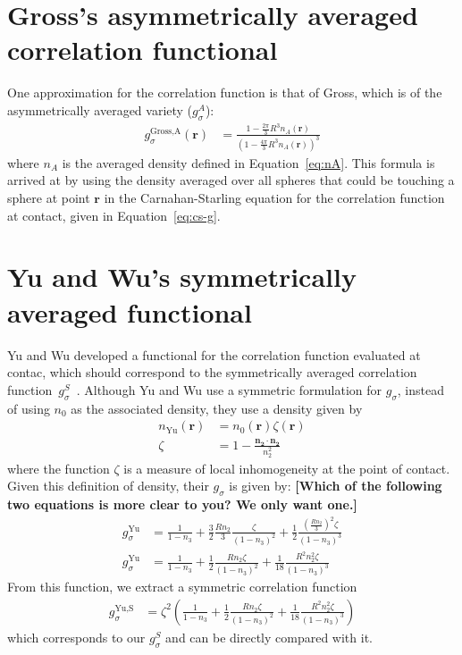 \documentclass[letterpaper,twocolumn,amsmath,amssymb,jcp,10pt,aip]{revtex4-1}
\newcommand{\red}[1]{{\bf \color{red} #1}}
\newcommand{\rr}{\textbf{r}}
\newcommand{\fixme}[1]{\red{[#1]}}
\begin{document}
\section{Gross's asymmetrically averaged correlation functional}\label{sec:gross}
One approximation for the correlation function is that of
Gross\cite{gross2009density}, which is of the asymmetrically averaged
variety ($g_\sigma^A$):
\begin{align}
  g_\sigma^\text{Gross,A}(\rr) &= \frac{1 - \frac{2\pi}{3}R^3n_A(\rr)}{\left(1 -
    \frac{4\pi}{3}R^3n_A(\rr)\right)^3}
\end{align}
where $n_A$ is the averaged density defined in Equation~\ref{eq:nA}.
This formula is arrived at by using the density averaged over all
spheres that could be touching a sphere at point $\rr$ in the
Carnahan-Starling equation for the correlation function at contact,
given in Equation~\ref{eq:cs-g}.

\section{Yu and Wu's symmetrically averaged functional}\label{sec:yuwu}

Yu and Wu developed a functional for the correlation function
evaluated at contac, which should correspond to the symmetrically
averaged correlation
function~$g_\sigma^S$~\cite{yu2002fmt-dft-inhomogeneous-associating}.
Although Yu and Wu use a symmetric formulation for $g_\sigma$, instead
of using $n_0$ as the associated density, they use a density given by
\begin{align}
  n_\text{Yu}(\rr) &= n_0(\rr) \zeta(\rr) \\
  \zeta &= 1 - \frac{\mathbf{n_2}\cdot\mathbf{n_2}}{n_2^2}
\end{align}
where the function $\zeta$ is a measure of local inhomogeneity at the
point of contact.  Given this definition of density, their $g_\sigma$
is given by: \fixme{Which of the following two equations is more clear
  to you? We only want one.}
\begin{align}
  g_\sigma^\text{Yu} &= \frac{1}{1-n_3}
    + \frac32 \frac{R n_2}{3}\frac{\zeta}{(1-n_3)^2}
    + \frac12 \frac{\left(\frac{R n_2}{3}\right)^2 \zeta}{(1-n_3)^3}
    \\
  g_\sigma^\text{Yu} &= \frac{1}{1-n_3}
    + \frac12 \frac{R n_2\zeta}{(1-n_3)^2}
    + \frac1{18} \frac{R^2 n_2^2 \zeta}{(1-n_3)^3}
\end{align}
From this function, we extract a symmetric correlation function
\begin{align}
  g_\sigma^\text{Yu,S} &= \zeta^2\left(\frac{1}{1-n_3}
    + \frac12 \frac{R n_2\zeta}{(1-n_3)^2}
    + \frac1{18} \frac{R^2 n_2^2 \zeta}{(1-n_3)^3}\right)
\end{align}
which corresponds to our $g_\sigma^S$ and can be directly compared
with it.
\end{document}
